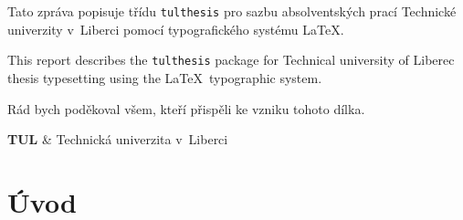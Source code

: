 \documentclass[FP,DP]{tulthesis}
\begin{document}

\begin{abstractCZ}
Tato zpráva popisuje třídu \texttt{tulthesis} pro sazbu absolventských prací
Technické univerzity v~Liberci pomocí typografického systému \LaTeX.
\end{abstractCZ}

\vspace{2cm}

\begin{abstractEN}
This report describes the \texttt{tulthesis} package for Technical university of
Liberec thesis typesetting using the \LaTeX\ typographic system.
\end{abstractEN}

\clearpage

\begin{acknowledgement}
Rád bych poděkoval všem, kteří přispěli ke vzniku tohoto dílka.
\end{acknowledgement}

\tableofcontents

\clearpage

\begin{abbrList}
\textbf{TUL} & Technická univerzita v~Liberci \\
\end{abbrList}
\listoftodos
\chapter{Úvod}
\end{document}
